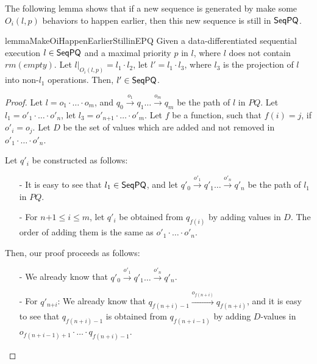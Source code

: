 


The following lemma shows that if a new sequence is generated by make some $O_i(l,p)$ behaviors to happen earlier, then this new sequence is still in $\mathsf{SeqPQ}$.

\begin{restatable}{lemma}{MakeOiHappenEarlierStillinEPQ}
\label{lemma:make Oi happen earlier still in EPQ}
Given a data-differentiated sequential execution $l \in \mathsf{SeqPQ}$ and a maximal priority $p$ in $l$, where $l$ does not contain $\textit{rm}(\textit{empty})$. Let $l \vert_{ O_i(l,p) } = l_1 \cdot l_2$, let $l' = l_1 \cdot l_3$, where $l_3$ is the projection of $l$ into non-$l_1$ operations. Then, $l' \in \mathsf{SeqPQ}$.
\end{restatable}

\begin {proof}
Let $l=o_1 \cdot \ldots \cdot o_m$, and $q_0 \xrightarrow{o_1} q_1 \ldots \xrightarrow{o_m} q_m$ be the path of $l$ in $\textit{PQ}$. Let $l_1 = o'_1 \cdot \ldots \cdot o'_n$, let $l_3 = o'_{\textit{n+1}} \cdot \ldots \cdot o'_m$. Let $f$ be a function, such that $f(i)=j$, if $o'_i = o_j$. Let $D$ be the set of values which are added and not removed in $o'_1 \cdot \ldots \cdot o'_n$.

Let $q'_i$ be constructed as follows:

\begin{itemize}
\setlength{\itemsep}{0.5pt}
\item[-] It is easy to see that $l_1 \in \mathsf{SeqPQ}$, and let $q'_0 \xrightarrow{o'_1} q'_1 \ldots \xrightarrow{o'_n} q'_n$ be the path of $l_1$ in $\textit{PQ}$.

\item[-] For $\textit{n+1} \leq i \leq m$, let $q'_i$ be obtained from $q_{f(i)}$ by adding values in $D$. The order of adding them is the same as $o'_1 \cdot \ldots \cdot o'_n$.
\end{itemize}

Then, our proof proceeds as follows:

\begin{itemize}
\setlength{\itemsep}{0.5pt}
\item[-] We already know that $q'_0 \xrightarrow{o'_1} q'_1 \ldots \xrightarrow{o'_n} q'_n$.

\item[-] For $q'_{\textit{n+i}}$: We already know that $q_{f(n+i)-1} \xrightarrow{o_{f(n+i)}} q_{f(n+i)}$, and it is easy to see that $q_{f(n+i)-1}$ is obtained from $q_{f(n+i-1)}$ by adding $D$-values in $o_{f(n+i-1)+1} \cdot \ldots \cdot q_{f(n+i)-1}$.


\end{itemize}
\end{proof}
